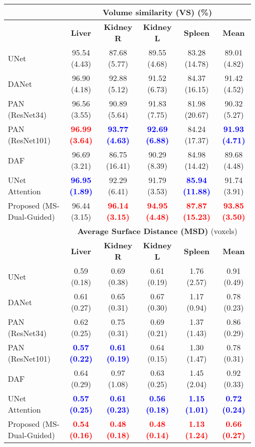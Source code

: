 \documentclass[journal]{IEEEtran}
\begin{document}
\begin{table*}[t!]
\begin{tabular}{lcccc|c}
\midrule
& \multicolumn{5}{c}{\textbf{Volume similarity (VS)} (\%)}\\
 \midrule
 & \textbf{Liver} & \textbf{Kidney R} & \textbf{Kidney L} & \textbf{Spleen} & \textbf{Mean}  \\
 \midrule
UNet \cite{ronneberger2015u}  &  95.54 (4.43)& 87.68 (5.77)& 89.55 (4.68)& 83.28 (14.78)& 89.01 (4.82)\\
DANet \cite{fu2018dual}  &  96.90 (4.18) & 92.88 (5.12)& 91.52 (6.73) & 84.37 (16.15)& 91.42  (4.52)   \\
PAN (ResNet34) \cite{li2018pyramid}   &  96.56 (3.55)  & 90.89 (5.64) & 91.83 (7.75) & 81.98 (20.67) & 90.32 (5.27) \\
PAN (ResNet101) \cite{li2018pyramid}   & \textcolor{red}{\textbf{96.99 (3.64)}}  & \textcolor{blue}{\textbf{93.77 (4.63)}} & \textcolor{blue}{\textbf{92.69 (6.88)}} & 84.24 (17.37) & \textcolor{blue}{\textbf{91.93 (4.71)}} \\
DAF \cite{wang18d}  &  96.69 (3.21) & 86.75 (16.41) & 90.29 (8.39) & 84.98 (14.42) &   89.68 (4.48)  \\
UNet Attention \cite{schlemper2019attention}  &   \textcolor{blue}{\textbf{96.95 (1.89)}} & 92.29 (6.41)& 91.79 (3.53) & \textcolor{blue}{\textbf{85.94 (11.88)}} &  91.74 (3.91)   \\
Proposed (MS-Dual-Guided)  &  96.44 (3.15)  & \textcolor{red}{\textbf{96.14 (3.15)}}& \textcolor{red}{\textbf{94.95 (4.48)}}  & \textcolor{red}{\textbf{87.87 (15.23)}} & \textcolor{red}{\textbf{93.85 (3.50)}} \\
\midrule
& \multicolumn{5}{c}{\textbf{Average Surface Distance (MSD)} (voxels)}\\
 \midrule
 & \textbf{Liver} & \textbf{Kidney R} & \textbf{Kidney L} & \textbf{Spleen} & \textbf{Mean}  \\
 \midrule
UNet \cite{ronneberger2015u}  & 0.59 (0.18)& 0.69 (0.38)& 0.61 (0.19)& 1.76 (2.57)& 0.91 (0.49) \\
DANet \cite{fu2018dual}  &  0.61 (0.27) & 0.65 (0.31)& 0.67 (0.30) & 1.17 (0.94)& 0.78  (0.23)   \\
PAN (ResNet34)\cite{li2018pyramid}   & 0.62 (0.25)  & 0.75 (0.31) & 0.69 (0.21) & 1.37 (1.43) & 0.86 (0.29) \\
PAN (ResNet101) \cite{li2018pyramid}   & \textcolor{blue}{\textbf{0.57 (0.22)}}  & \textcolor{blue}{\textbf{0.61 (0.19)}} & 0.64 (0.15) & 1.30 (1.47) & 0.78 (0.31) \\
DAF \cite{wang18d}  & 0.64 (0.29) & 0.97 (1.08) & 0.63 (0.25)& 1.45 (2.04)&  0.92 (0.33)  \\
UNet Attention \cite{schlemper2019attention}  &   \textcolor{blue}{\textbf{0.57 (0.25)}} & \textcolor{blue}{\textbf{0.61 (0.23)}}&  \textcolor{blue}{\textbf{0.56 (0.18)}} & \textcolor{blue}{\textbf{1.15 (1.01)}}&  \textcolor{blue}{\textbf{0.72 (0.24)}}   \\
Proposed (MS-Dual-Guided)  & \textcolor{red}{\textbf{0.54 (0.16)}}  & \textcolor{red}{\textbf{0.48 (0.18)}}&  \textcolor{red}{\textbf{0.48 (0.14)}} & \textcolor{red}{\textbf{1.13 (1.24)}} &  \textcolor{red}{\textbf{0.66 (0.27)}} \\
\midrule
\midrule
\end{tabular}


\end{table*}
\end{document}
